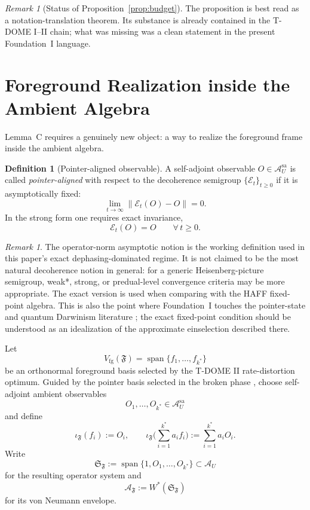 \documentclass[12pt]{article}
\theoremstyle{definition}
\newtheorem{definition}[theorem]{Definition}
\theoremstyle{remark}
\newtheorem{remark}[theorem]{Remark}
\begin{document}
\begin{remark}[Status of Proposition~\ref{prop:budget}]
The proposition is best read as a notation-translation theorem. Its
substance is already contained in the T-DOME I--II chain; what was
missing was a clean statement in the present Foundation~I language.
\end{remark}

\section{Foreground Realization inside the Ambient Algebra}\label{sec:foreground}

Lemma~C requires a genuinely new object: a way to realize the
foreground frame inside the ambient algebra.

\begin{definition}[Pointer-aligned observable]\label{def:pointer}
A self-adjoint observable \(O\in\mathcal A_U^{\mathrm{sa}}\) is called
\emph{pointer-aligned} with respect to the decoherence semigroup
\(\{\mathcal E_t\}_{t\ge 0}\) if it is asymptotically fixed:
\[
\lim_{t\to\infty}\|\mathcal E_t(O)-O\|=0.
\]
In the strong form one requires exact invariance,
\[
\mathcal E_t(O)=O
\qquad
\forall\, t\ge 0.
\]
\end{definition}

\begin{remark}
The operator-norm asymptotic notion is the working definition used in
this paper's exact dephasing-dominated regime. It is not claimed to be
the most natural decoherence notion in general: for a generic
Heisenberg-picture semigroup, weak*, strong, or predual-level
convergence criteria may be more appropriate. The exact version is used
when comparing with the HAFF fixed-point algebra. This is also the point
where Foundation~I touches the pointer-state and quantum Darwinism
literature \cite{Zurek2003,Zurek2009}; the exact fixed-point condition
should be understood as an idealization of the approximate einselection
described there.
\end{remark}

Let
\[
V_{\mathrm{fg}}(\mathfrak F)=\operatorname{span}\{f_1,\dots,f_{k^*}\}
\]
be an orthonormal foreground basis selected by the T-DOME II
rate-distortion optimum. Guided by the pointer basis selected in the
broken phase \cite{TDOMEII}, choose self-adjoint ambient observables
\[
O_1,\dots,O_{k^*}\in\mathcal A_U^{\mathrm{sa}}
\]
and define
\[
\iota_{\mathfrak F}(f_i):=O_i,
\qquad
\iota_{\mathfrak F}\Big(\sum_{i=1}^{k^*} a_i f_i\Big)
:=
\sum_{i=1}^{k^*} a_i O_i.
\]
Write
\[
\mathfrak S_{\mathfrak F}
:=
\operatorname{span}\{1,O_1,\dots,O_{k^*}\}
\subset\mathcal A_U
\]
for the resulting operator system and
\[
\mathcal A_{\mathfrak F}:=W^*(\mathfrak S_{\mathfrak F})
\]
for its von Neumann envelope.
\end{document}
